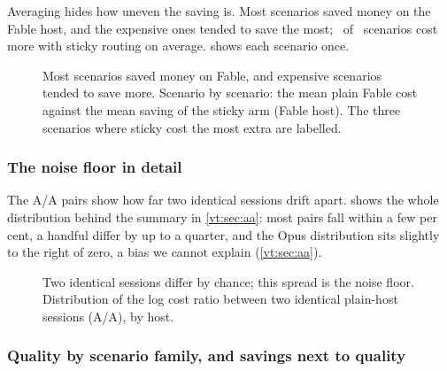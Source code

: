 Averaging hides how uneven the saving is. Most scenarios saved money on the Fable host, and the expensive ones
tended to save the most; \ScNegative\ of \ScN\ scenarios cost more with sticky routing on average.
 shows each scenario once.

\begin{figure}[tbp]
\centering
{}\par\smallskip

\caption{Most scenarios saved money on Fable, and expensive scenarios tended to save more. Scenario by scenario: the mean plain Fable cost against the mean saving of the sticky arm (Fable host). The three
scenarios where sticky cost the most extra are labelled.}
\label{vt:fig:scenario}
\end{figure}


\subsubsection{The noise floor in detail}

The A/A pairs show how far two identical sessions drift apart.  shows the whole distribution
behind the summary in \cref{vt:sec:aa}: most pairs fall within a few per cent, a handful differ by up to a quarter, and
the Opus distribution sits slightly to the right of zero, a bias we cannot explain (\cref{vt:sec:aa}).

\begin{figure}[tbp]
\centering
{}\par\smallskip

\caption{Two identical sessions differ by chance; this spread is the noise floor. Distribution of the log cost ratio between two identical plain-host sessions (A/A), by host.}
\label{vt:fig:aahist}
\end{figure}


\subsubsection{Quality by scenario family, and savings next to quality}\label{vt:sec:joint}

